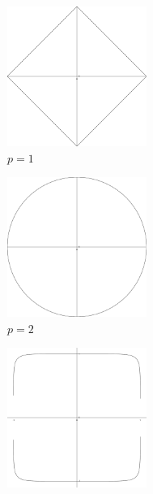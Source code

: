 \begin{figure}[!htb]
  \centering
  \begin{subfigure}{0.49\textwidth}
    \includegraphics[width=0.5\textwidth]{shots/unit_circle_1}
    \caption{$p = 1$}
    \label{unit_circle_1}
  \end{subfigure}
  \begin{subfigure}{0.49\textwidth}
    \includegraphics[width=0.5\textwidth]{shots/unit_circle_2}
    \caption{$p = 2$}
    \label{unit_circle_2}
  \end{subfigure}
  \begin{subfigure}{0.49\textwidth}
    \includegraphics[width=0.5\textwidth]{shots/unit_circle_10}

\end{subfigure}
\end{figure}

